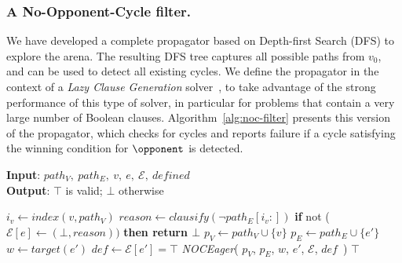 \documentclass[a4paper,UKenglish,cleveref, autoref, thm-restate, anonymous]{lipics-v2021}
\begin{document}
\subsubsection{A No-Opponent-Cycle filter.} \label{sec:nocfilter}
We have developed a complete propagator based on Depth-first Search (DFS) to explore the arena. The resulting DFS tree captures all possible paths from $v_0$, and can be used to detect all existing cycles. We define the propagator in the context of a \textit{Lazy Clause Generation} solver~\cite{DBLP:journals/constraints/OhrimenkoSC09}, to take advantage of the strong performance of this type of solver, in particular for problems that contain a very large number of Boolean clauses. Algorithm~\ref{alg:noc-filter} presents this version of the propagator, which checks for cycles and reports failure if a cycle 
satisfying the winning condition for 
$\opponent$ is detected.

\begin{algorithm}[htb]
\small
\caption{\textbf{\textit{NOCFilter}}}
\textbf{Input}: $path_V,\ path_E,\ v,\ e,\ \mathcal{E},\ \textit{defined}$ \\
\textbf{Output}: $\top$ is valid; $\bot$ otherwise
\begin{algorithmic}[1]
     \label{alg:noc-filter:pathcheck}
        \STATE $i_v \gets \textit{index}(v, path_V)$
        \IF{$\neg \gamma_{\player}$} \label{alg:noc-filter:condition}
            \STATE $\textit{reason} \gets \textit{clausify}(\neg path_E[i_v:])$ \label{alg:noc-eager:reason}
            \STATE \textbf{if }not ($\mathcal{E}[e] \gets (\bot, \textit{reason}))$ \textbf{then return $\bot$} \label{alg:noc-eager:ruleoutedge}
        \ENDIF
     \label{alg:noc-eager:defcheck}
         \label{alg:no-opponent-cycle-f1:edgecheck}
            \STATE $p_V \gets path_V \cup \{v\}$
            \STATE $p_E \gets path_E \cup \{e'\}$
            \STATE $w \gets \textit{target}(e')$
            \STATE $\textit{def} \gets \mathcal{E}[e'] = \top$
            \STATE \textit{NOCEager}(
                $p_V$,
                $p_E$,
                $w$,
                $e'$,
                $\mathcal{E}$,
                $\textit{def}$\ )
        \ENDFOR
    \ENDIF
    \RETURN $\top$
\end{algorithmic}
\label{alg:noc-filter}
\end{algorithm}
\end{document}
